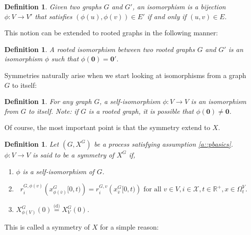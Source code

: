 \documentclass[12pt]{article}
\newcommand{\mb}{\mathbb}
\newcommand{\mc}{\mathcal}
\newcommand{\ra}{\rightarrow}
\newcommand{\ov}{\overline}
\newcommand{\te}{\text}
\newcommand{\deq}{\overset{\text{(d)}}{=}}			%
\newcommand{\sta}{\mc{X}}							%
\newcommand{\cl}[1]{\ov{#1}}						%
\renewcommand{\root}{\mathbf{0}}
\newcommand{\Xf}{X}									%
\newcommand{\rate}{r}								%
\newcommand{\vind}[1]{_{#1}}						%
\newcommand{\tme}[1]{(#1)}							%
\newcommand{\tmi}[1]{#1}							%
\newcommand{\gind}[1]{^{#1}}						%
\newcommand{\vpara}[1]{^{#1}}						%
\newcommand{\stpara}[1]{_{#1}}						%
\newcommand{\tpara}[1]{_{#1}}						%
\newcommand{\gvpara}[2]{^{#1,#2}}					%
\newcommand{\xf}{x}									%
\newtheorem{defn}[thms]{Definition}
\begin{document}
\begin{defn}
Given two graphs \(G\) and \(G'\), an isomorphism is a bijection \(\phi: V \ra V'\) that satisfies \((\phi(u),\phi(v)) \in E'\) if and only if \((u,v) \in E\).
\label{a::iso}
\end{defn}

This notion can be extended to rooted graphs in the following manner:

\begin{defn}
A rooted isomorphism between two rooted graphs \(G\) and \(G'\) is an isomorphism \(\phi\) such that \(\phi(\root) = \root'\).
\label{a::riso}
\end{defn}

Symmetries naturally arise when we start looking at isomorphisms from a graph \(G\) to itself:

\begin{defn}
For any graph \(G\), a self-isomorphism \(\phi: V \ra V\) is an isomorphism from \(G\) to itself. Note: if \(G\) is a rooted graph, it is possible that \(\phi(\root) \neq \root\).
\label{a:siso}
\end{defn}

Of course, the most important point is that the symmetry extend to \(\Xf\).

\begin{defn}
Let \((G,\Xf\gind{G})\) be a process satisfying assumption \ref{a::pbasics}. \(\phi: V \ra V\) is said to be a symmetry of \(\Xf\gind{G}\) if,

\begin{enumerate}
\item \(\phi\) is a self-isomorphism of \(G\).

\item 

\begin{equation}
\rate\gvpara{G}{\phi(v)}\stpara{i}\left(\xf\gind{G}\vind{\phi(\cl{v})}\tmi{[0,t)}\right) = \rate\gvpara{G}{v}\stpara{i}\left(\xf\gind{G}\vind{\cl{v}}\tmi{[0,t)}\right) \te{ for all } v \in V,i \in \sta, t \in \mb{R}^+, \xf\in \Omega\vpara{V}\tpara{t}.
\label{a::ratesym}
\end{equation}

\item \(\Xf\gind{G}\vind{\phi(V)}\tme{0} \deq \Xf\gind{G}\vind{V}\tme{0}\).
\end{enumerate}
\label{a:Xsim}
\end{defn}

This is called a symmetry of \(\Xf\) for a simple reason:
\end{document}
